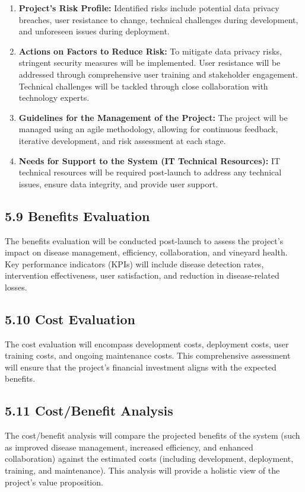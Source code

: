 \begin{enumerate}
    \item \textbf{Project’s Risk Profile:} Identified risks include potential data privacy breaches, user resistance to change, technical challenges during development, and unforeseen issues during deployment.

    \item \textbf{Actions on Factors to Reduce Risk:} To mitigate data privacy risks, stringent security measures will be implemented. User resistance will be addressed through comprehensive user training and stakeholder engagement. Technical challenges will be tackled through close collaboration with technology experts.

    \item \textbf{Guidelines for the Management of the Project:} The project will be managed using an agile methodology, allowing for continuous feedback, iterative development, and risk assessment at each stage.

    \item \textbf{Needs for Support to the System (IT Technical Resources):} IT technical resources will be required post-launch to address any technical issues, ensure data integrity, and provide user support.
\end{enumerate}

\subsection{5.9 Benefits Evaluation}

The benefits evaluation will be conducted post-launch to assess the project's impact on disease management, efficiency, collaboration, and vineyard health. Key performance indicators (KPIs) will include disease detection rates, intervention effectiveness, user satisfaction, and reduction in disease-related losses.

\subsection{5.10 Cost Evaluation}

The cost evaluation will encompass development costs, deployment costs, user training costs, and ongoing maintenance costs. This comprehensive assessment will ensure that the project's financial investment aligns with the expected benefits.

\subsection{5.11 Cost/Benefit Analysis}

The cost/benefit analysis will compare the projected benefits of the system (such as improved disease management, increased efficiency, and enhanced collaboration) against the estimated costs (including development, deployment, training, and maintenance). This analysis will provide a holistic view of the project's value proposition.






